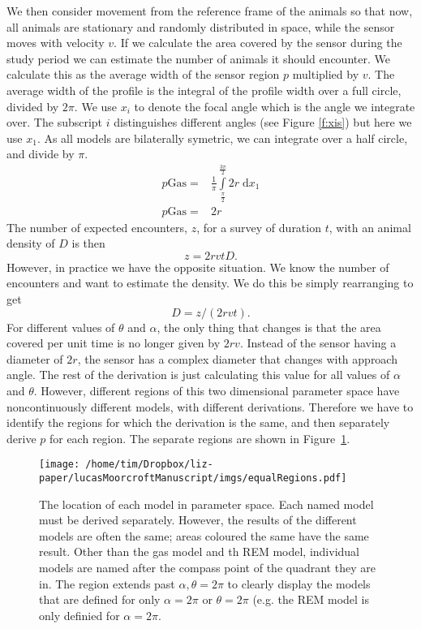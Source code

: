 We then consider movement from the reference frame of the animals so that now, all animals are stationary and randomly distributed in space, while the sensor moves with velocity $v$. If we calculate the area covered by the sensor during the study period we can estimate the number of animals it should encounter. We calculate this as the average width of the sensor region $p$ multiplied by $v$. The average width of the profile is the integral of the profile width over a full circle, divided by $2\pi$. We use $x_i$ to denote the focal angle which is the angle we integrate over. The subscript $i$ distinguishes different angles (see Figure \ref{f:xis}) but here we use $x_1$.  As all models are bilaterally symetric, we can integrate over a half circle, and divide by $\pi$.
\begin{align}
p\text{Gas} =& \frac{1}{\pi}\int\limits_{\frac{\pi}{2}}^{\frac{3\pi}{2}} 2r \; \mathrm{d}x_1\\
p\text{Gas} =& 2r
\end{align}
The number of expected encounters, $z$, for a survey of duration $t$, with an animal density of $D$ is then
\begin{equation}
	z = 2rvtD.
\end{equation}
However, in practice we have the opposite situation. We know the number of encounters and want to estimate the density. We do this be simply rearranging to get
\begin{equation}
	D = z/(2rvt).
\end{equation}
For different values of $\theta$ and $\alpha$, the only thing that changes is that the area covered per unit time is no longer given by $2rv$. Instead of the sensor having a diameter of $2r$, the sensor has a complex diameter that changes with approach angle. The rest of the derivation is just calculating this value for all values of $\alpha$ and $\theta$. However, different regions of this two dimensional parameter space have noncontinuously different models, with different derivations. Therefore we have to identify the regions for which the derivation is the same, and then separately derive $p$ for each region. The separate regions are shown in Figure~\ref{f:equalRegions}.

\begin{figure}[t]
\centering
\texttt{[image: /home/tim/Dropbox/liz-paper/lucasMoorcroftManuscript/imgs/equalRegions.pdf]}
\caption{The location of each model in parameter space. Each named model must be derived separately. However, the results of the different models are often the same; areas coloured the same have the same result. Other than the gas model and th REM model, individual models are named after the compass point of the quadrant they are in. The region extends past $\alpha, \theta=2\pi$ to clearly display the models that are defined for only $\alpha=2\pi$ or $\theta=2\pi$ (e.g. the REM model is only definied for $\alpha=2\pi$.}
\label{f:equalRegions}
\end{figure}


